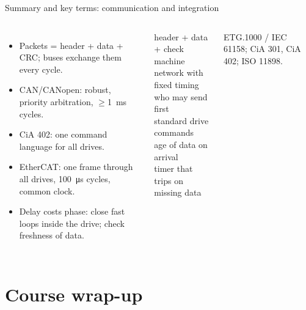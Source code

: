 \documentclass[aspectratio=169,10pt]{beamer}
\begin{document}
\begin{frame}{Summary and key terms: communication and integration}
\begin{columns}[T]
\begin{itemize}\small
\item Packets = header + data + CRC; buses exchange them every cycle.
\item CAN/CANopen: robust, priority arbitration, $\ge$\SI{1}{ms} cycles.
\item CiA 402: one command language for all drives.
\item EtherCAT: one frame through all drives, \SI{100}{\micro s} cycles, common clock.
\item Delay costs phase: close fast loops inside the drive; check freshness of data.
\end{itemize}
\begin{defbox}
\small
{} header + data + check\\
 machine network with fixed timing\\
 who may send first\\
 standard drive commands\\
 age of data on arrival\\
 timer that trips on missing data
\end{defbox}
{\scriptsize\color{mkGray} ETG.1000 / IEC 61158; CiA 301, CiA 402; ISO 11898.}
\end{columns}
\end{frame}

\section{Course wrap-up}
\end{document}
